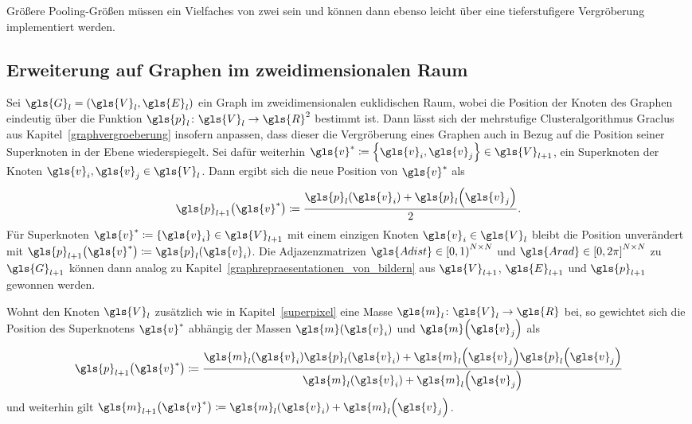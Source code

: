 Größere Pooling-Größen müssen ein Vielfaches von zwei sein und können dann ebenso leicht über eine tieferstufigere Vergröberung implementiert werden.

\subsection{Erweiterung auf Graphen im zweidimensionalen Raum}
\label{pooling_erweiterung}

Sei $\gls{G}_l = \left(\gls{V}_l, \gls{E}_l\right)$ ein Graph im zweidimensionalen euklidischen Raum, wobei die Position der Knoten des Graphen eindeutig über die Funktion $\gls{p}_l \colon \gls{V}_l \to \gls{R}^2$ bestimmt ist.
Dann lässt sich der mehrstufige Clusteralgorithmus Graclus aus Kapitel~\ref{graphvergroeberung} insofern anpassen, dass dieser die Vergröberung eines Graphen auch in Bezug auf die Position seiner Superknoten in der Ebene wiederspiegelt.
Sei dafür weiterhin $\gls{v}^* \coloneqq \left\{ \gls{v}_i, \gls{v}_j \right\} \in \gls{V}_{l+1}$, ein Superknoten der Knoten $\gls{v}_i, \gls{v}_j \in \gls{V}_l$.
Dann ergibt sich die neue Position von $\gls{v}^*$ als
\begin{equation*}
  \gls{p}_{l+1}\left(\gls{v}^*\right) \coloneqq \frac{\gls{p}_l\left(\gls{v}_i\right) + \gls{p}_l\left(\gls{v}_j\right)}{2}.
\end{equation*}
Für Superknoten $\gls{v}^* \coloneqq \left\{\gls{v}_i\right\} \in \gls{V}_{l+1}$ mit einem einzigen Knoten $\gls{v}_i \in \gls{V}_l$ bleibt die Position unverändert mit $\gls{p}_{l+1}\left(\gls{v}^*\right) \coloneqq \gls{p}_l\left(\gls{v}_i\right)$.
Die Adjazenzmatrizen $\gls{Adist} \in {\left[0, 1\right)}^{N \times N}$ und $\gls{Arad} \in {\left[0, 2\pi\right]}^{N \times N}$ zu $\gls{G}_{l+1}$ können dann analog zu Kapitel~\ref{graphrepraesentationen_von_bildern} aus $\gls{V}_{l+1}$, $\gls{E}_{l+1}$ und $\gls{p}_{l+1}$ gewonnen werden.

Wohnt den Knoten $\gls{V}_l$ zusätzlich wie in Kapitel~\ref{superpixel} eine Masse $\gls{m}_l \colon \gls{V}_l \to \gls{R}$ bei, so gewichtet sich die Position des Superknotens $\gls{v}^*$ abhängig der Massen $\gls{m}\left(\gls{v}_i\right)$ und $\gls{m}\left(\gls{v}_j\right)$ als
\begin{equation*}
  \gls{p}_{l+1}\left(\gls{v}^*\right) \coloneqq \frac{\gls{m}_l\left(\gls{v}_i\right) \gls{p}_l\left(\gls{v}_i\right) + \gls{m}_l\left(\gls{v}_j\right) \gls{p}_l\left(\gls{v}_j\right)}{\gls{m}_l\left(\gls{v}_i\right) + \gls{m}_l\left(\gls{v}_j\right)}
\end{equation*}
und weiterhin gilt $\gls{m}_{l+1}\left(\gls{v}^*\right) \coloneqq \gls{m}_l\left(\gls{v}_i\right) + \gls{m}_l\left(\gls{v}_j\right)$.
